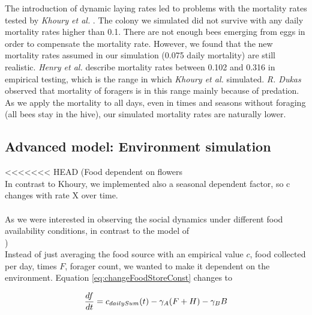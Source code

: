 		The introduction of dynamic laying rates led to problems with the mortality rates tested by \textit{Khoury et al.} \cite{khoury13}. The colony we simulated did not survive with any daily mortality rates higher than 0.1. There are not enough bees emerging from eggs in order to compensate the mortality rate. However, we found that the new mortality rates assumed in our simulation (0.075 daily mortality) are still realistic. \textit{Henry et al.} \cite{henry12} describe mortality rates between 0.102 and 0.316 in empirical testing, which is the range in which \textit{Khoury et al.} \cite{khoury13} simulated. \textit{R. Dukas} \cite{dukas08} observed that mortality of foragers is in this range mainly because of predation. As we apply the mortality to all days, even in times and seasons without foraging (all bees stay in the hive), our simulated mortality rates are naturally lower.
	
	\subsection{Advanced model: Environment simulation}
		\label{chap:advancedModel}
		
<<<<<<< HEAD
		(Food dependent on flowers\\
		In contrast to Khoury, we implemented also a seasonal dependent factor, so c changes with rate X over time. \\
		\\
		As we were interested in observing the social dynamics under different food availability conditions, in contrast to the model of 
		\\)
		\\
		Instead of just averaging the food source with an empirical value $c$, food collected per day, times $F$, forager count, we wanted to make it dependent on the environment. Equation \ref{eq:changeFoodStoreConst} changes to 
		
		\begin{equation}\label{eq:changeFoodStoreDyn}
			{df \over dt} = c_{dailySum}(t) - \gamma_A (F+H) - \gamma_B B
		\end{equation}
		
				
		 
